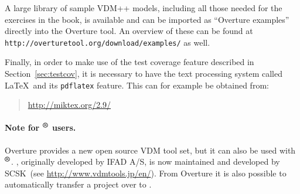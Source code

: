 \begin{description}

\end{description}

A large library of sample VDM++ models, including all those needed for the exercises in the book, is available and can be imported as ``Overture examples'' directly into the Overture tool.  An overview of these can be found at \texttt{http://overturetool.org/download/examples/} as well.

Finally, in order to make use of the test coverage feature described in Section~\ref{sec:testcov}, it is
necessary to have the text processing system called \LaTeX\ and its \texttt{pdflatex} feature. This can for example be obtained from:
%
\begin{quote}
\url{http://miktex.org/2.9/}
\end{quote}

\paragraph{Note for \vdmtools$^{\mbox{\small\textbf{{\textregistered}}}}$ users.}
Overture provides a new open source VDM tool set, but it can also be used with \vdmtools$^{\mbox{\small\textbf{{\textregistered}}}}$. \vdmtools, originally developed by IFAD A/S, is now maintained and developed by SCSK~(see \url{http://www.vdmtools.jp/en/}). From Overture it is also possible to automatically transfer a project over to \vdmtools.


